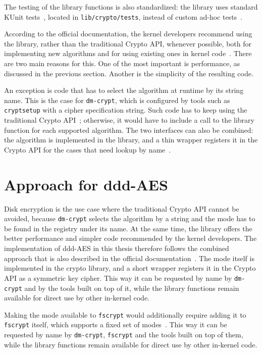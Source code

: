 \documentclass[
  digital,     %
  oneside,     %
  nosansbold,  %
  nocolorbold, %
  lof,         %
  lot,         %
]{fithesis4}
\begin{document}
The testing of the library functions is also standardized: the library uses standard KUnit tests~\cite{noauthor_kunit_nodate}, located in \texttt{lib/crypto/tests}, instead of custom ad-hoc tests~\cite{noauthor_crypto_nodate}.

According to the official documentation, the kernel developers recommend using the library, rather than the traditional Crypto API, whenever possible, both for implementing new algorithms and for using existing ones in kernel code~\cite{noauthor_crypto_nodate}. There are two main reasons for this. One of the most important is performance, as discussed in the previous section. Another is the simplicity of the resulting code.

An exception is code that has to select the algorithm at runtime by its string name. This is the case for \texttt{dm-crypt}, which is configured by tools such as \texttt{cryptsetup} with a cipher specification string. Such code has to keep using the traditional Crypto API~\cite{noauthor_crypto_nodate}; otherwise, it would have to include a call to the library function for each supported algorithm. The two interfaces can also be combined: the algorithm is implemented in the library, and a thin wrapper registers it in the Crypto API for the cases that need lookup by name~\cite{noauthor_crypto_nodate}.

\section{Approach for ddd-AES}

Disk encryption is the use case where the traditional Crypto API cannot be avoided, because \texttt{dm-crypt} selects the algorithm by a string and the mode has to be found in the registry under its name. At the same time, the library offers the better performance and simpler code recommended by the kernel developers. The implementation of ddd-AES in this thesis therefore follows the combined approach that is also described in the official documentation~\cite{noauthor_crypto_nodate}. The mode itself is implemented in the crypto library, and a short wrapper registers it in the Crypto API as a symmetric key cipher. This way it can be requested by name by \texttt{dm-crypt} and by the tools built on top of it, while the library functions remain available for direct use by other in-kernel code. 

Making the mode available to \texttt{fscrypt} would additionally require adding it to \texttt{fscrypt} itself, which supports a fixed set of modes~\cite{noauthor_filesystem-level_nodate}. This way it can be requested by name by \texttt{dm-crypt}, \texttt{fscrypt} and the tools built on top of them, while the library functions remain available for direct use by other in-kernel code.
\end{document}
